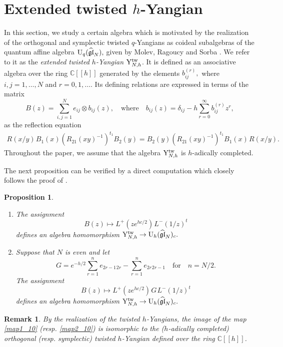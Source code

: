 \documentclass[12pt,a4paper,reqno]{amsart}
\theoremstyle{stil}
\theoremstyle{defi}
\theoremstyle{defi}
\newtheorem{rem}[thm]{Remark}
\theoremstyle{stil}
\newtheorem{pro}[thm]{Proposition}
\theoremstyle{stil}
\theoremstyle{stil}
\theoremstyle{prim}
\newcommand{\beq}{\begin{equation}}
\newcommand{\eeq}{\end{equation}}
\newcommand{\ot}{\otimes}
\newcommand{\ts}{\hspace{1pt}}
\newcommand{\uh}{{\rm U}_h (\widehat{\mathfrak{gl}}_N)_c}
\newcommand{\uq}{{\rm U}_q (\widehat{\mathfrak{gl}}_N)}
\newcommand{\yhg}{{\rm Y}_{N,h}^{\text{tw}} }
\newcommand{\CC}{\mathbb{C}}
\begin{document}
\section{Extended twisted \texorpdfstring{$h$}{h}-Yangian}\label{section_02}

 
In this section, we study a certain  algebra  which is motivated by the realization of   the orthogonal and symplectic twisted $q$-Yangians  as  coideal subalgebras  of the quantum affine algebra $\uq,$ given by Molev,   Ragoucy and Sorba \cite{MRS}. We refer to it as the {\em extended twisted $h$-Yangian $\yhg$}. It  is defined as 
an associative algebra over the ring $\CC[[h]]$ generated by the elements $b_{ij}^{ (r)},$ where $i,j=1,\ldots ,N $ and $r=0,1,\ldots.$ Its defining relations are expressed in terms of the matrix
$$
B (z)=\sum_{i,j=1}^N e_{ij} \ot b_{ij}  (z),\quad\text{where}\quad
b_{ij}  (z)=\delta_{ij}- h\sum_{r=0}^\infty b_{ij}^{ (r)} z^{  r},
$$
as  the   reflection equation 
\begin{gather}
R(x/y)\ts B_1 (x)\left(R_{21}(xy)^{-1}\right)^{t_1}  B_2 (y)
=
B_2 (y)\left(R_{21}(xy)^{-1}\right)^{t_1}B_1 (x)\ts R(x/y).\label{re}
\end{gather}
 Throughout the paper, we assume that  the algebra $\yhg$ is $h$-adically completed. 

The next proposition can be verified by a direct computation which closely follows the proof of   \cite[Prop. 4.20]{JZ}. 

\begin{pro}\label{pro_21}
\begin{enumerate}
\item
The
assignment  
\beq\label{map1_10}
B (z)\mapsto L^+(ze^{hc/2}) \ts L^-(1/z)^t 
\eeq 
defines an algebra homomorphism $\yhg\to\uh.$ 
\item
Suppose that $N $ is even and let 
$$G=e^{-h/2}\sum_{r=1}^n e_{2r-1\ts 2r} - \sum_{r=1}^n e_{2r\ts 2r-1}\quad\text{for}\quad n=N/2 .$$ The
assignment  
\beq\label{map2_10}
B (z)\mapsto L^+(ze^{hc/2})\ts G \ts L^-(1/z)^t 
\eeq
defines an algebra homomorphism $\yhg\to\uh.$ 
\end{enumerate}
\end{pro}


\begin{rem}\label{tw_10}
By the realization \cite[Sect. 3.3]{MRS} of the twisted $h$-Yangians, the image of the map \eqref{map1_10} (resp. \eqref{map2_10}) is isomorphic to the ($h$-adically completed) orthogonal (resp. symplectic) twisted $h$-Yangian defined over the ring $\CC[[h]]$.
\end{rem}
 
\end{document}
